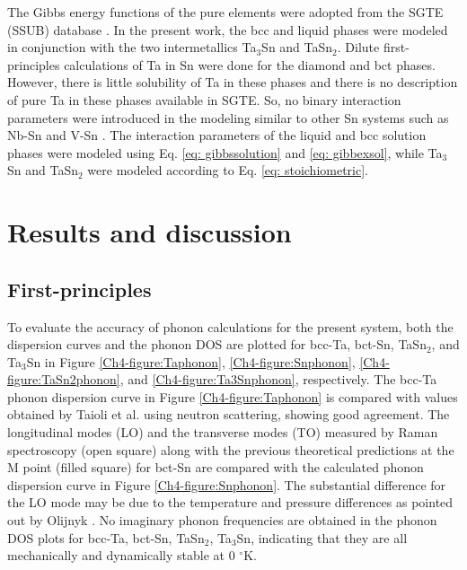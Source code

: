 The Gibbs energy functions of the pure elements were adopted from the SGTE (SSUB) database \cite{Dinsdale1991}. In the present work, the bcc and liquid phases were modeled in conjunction with the two intermetallics Ta$_3$Sn and TaSn$_2$. Dilute first-principles calculations of Ta in Sn were done for the diamond and bct phases. However, there is little solubility of Ta in these phases and there is no description of pure Ta in these phases available in SGTE. So, no binary interaction parameters were introduced in the modeling similar to other Sn systems such as Nb-Sn and V-Sn \cite{Yue2009,Toffolon2002}. The interaction parameters of the liquid and bcc solution phases were modeled using Eq. \ref{eq: gibbssolution} and \ref{eq: gibbexsol}, while Ta$_3$Sn and TaSn$_2$ were modeled according to Eq. \ref{eq: stoichiometric}.

\section{Results and discussion}

\subsection{First-principles}

To evaluate the accuracy of phonon calculations for the present system, both the dispersion curves and the phonon DOS are plotted for bcc-Ta, bct-Sn, TaSn$_2$, and Ta$_3$Sn in Figure \ref{Ch4-figure:Taphonon}, \ref{Ch4-figure:Snphonon}, \ref{Ch4-figure:TaSn2phonon}, and \ref{Ch4-figure:Ta3Snphonon}, respectively.  The bcc-Ta phonon dispersion curve in  Figure \ref{Ch4-figure:Taphonon} is compared with values obtained by Taioli et al. \cite{Taioli2007a} using neutron scattering, showing good agreement. The longitudinal modes (LO) and the transverse modes (TO) measured by Raman spectroscopy \cite{Olijnyk1992} (open square) along with the previous theoretical predictions at the M point (filled square) for bct-Sn are compared with the calculated phonon dispersion curve in Figure \ref{Ch4-figure:Snphonon}. The substantial difference for the LO mode may be due to the temperature and pressure differences as pointed out by Olijnyk \cite{Olijnyk1992}. No imaginary phonon frequencies are obtained in the phonon DOS plots for bcc-Ta, bct-Sn, TaSn$_2$, Ta$_3$Sn, indicating that they are all mechanically and dynamically stable at 0 $^\circ$K. 

